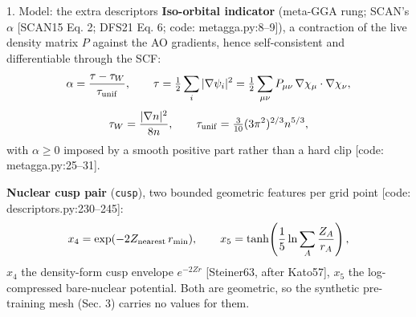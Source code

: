 \begin{frame}{1. Model: the extra descriptors}
  \textbf{Iso-orbital indicator} (meta-GGA rung; SCAN's $\alpha$ [SCAN15 Eq. 2; DFS21 Eq. 6; code: metagga.py:8--9]), a contraction of the live density matrix $P$ against the AO gradients, hence self-consistent and differentiable through the SCF:
  \[
  \alpha = \frac{\tau - \tau_W}{\tau_{\rm unif}}, \qquad
  \tau = \tfrac12 \sum_i |\nabla\psi_i|^2 = \tfrac12 \sum_{\mu\nu} P_{\mu\nu}\, \nabla\chi_\mu\cdot\nabla\chi_\nu,
  \]
  \[
  \tau_W = \frac{|\nabla n|^2}{8n}, \qquad
  \tau_{\rm unif} = \tfrac{3}{10}(3\pi^2)^{2/3} n^{5/3},
  \]
  with $\alpha \ge 0$ imposed by a smooth positive part rather than a hard clip [code: metagga.py:25--31].
  \vspace{0.1em}

  \textbf{Nuclear cusp pair} (\texttt{cusp}), two bounded geometric features per grid point [code: descriptors.py:230--245]:
  \[
  x_4 = \exp(-2 Z_{\rm nearest}\, r_{\min}), \qquad
  x_5 = \tanh\!\left(\frac{1}{5}\ln \sum_A \frac{Z_A}{r_A}\right),
  \]
  $x_4$ the density-form cusp envelope $e^{-2Zr}$ [Steiner63, after Kato57], $x_5$ the log-compressed bare-nuclear potential. Both are geometric, so the synthetic pre-training mesh (Sec. 3) carries no values for them.
\end{frame}
